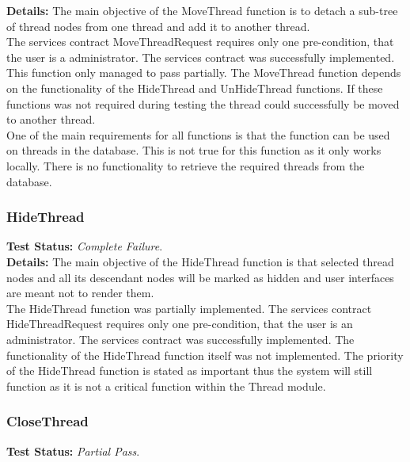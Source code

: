 \begin{flushleft}
\begin{flushleft}
	\textbf{Details:}
	The main objective of the MoveThread function is to detach a sub-tree of thread nodes from one thread and add it to another thread.\\
	The services contract MoveThreadRequest requires only one pre-condition, that the user is a administrator.
	The services contract was successfully implemented. This function only managed to pass partially. The MoveThread function depends on the functionality of the HideThread and UnHideThread functions. If these functions was not required during testing the thread could successfully be moved to another thread.\\
	One of the main requirements for all functions is that the function can be used on threads in the database. This is not true for this function as it only works locally. There is no functionality to retrieve the required threads from the database.

\end{flushleft}

\subsubsection{HideThread}
\begin{flushleft}
	\textbf{Test Status:} \emph{Complete Failure}. \\

	\textbf{Details:}
	The main objective of the HideThread function is that selected thread nodes and all	its descendant nodes will be marked as hidden and user interfaces are meant not to render them.\\
	The HideThread function was partially implemented. The services contract HideThreadRequest requires only one pre-condition, that the user is an administrator. The services contract was successfully implemented. The functionality of the HideThread function itself was not implemented. The priority of the HideThread function is stated as important thus the system will still function as it is not a critical function within the Thread module.
  
\end{flushleft}

\subsubsection{CloseThread}
\begin{flushleft}
	\textbf{Test Status:} \emph{Partial Pass}. \\
	

\end{flushleft}
\end{flushleft}
